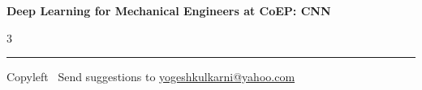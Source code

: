 \documentclass[8pt,landscape]{article}
\begin{document}
\footnotesize

\begin{center}
\Large{\textbf{Deep Learning for Mechanical Engineers at CoEP: CNN}}
\end{center}

\begin{multicols}{3}

\end{multicols}

\rule{\linewidth}{0.25pt}
\scriptsize
Copyleft \textcopyleft\  Send suggestions to
\href{http://www.yogeshkulkarni.com}{yogeshkulkarni@yahoo.com}
\end{document}
